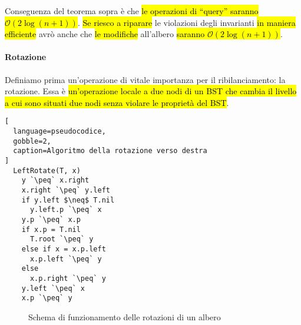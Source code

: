 \documentclass[a4paper,11pt,oneside]{article}
\theoremstyle{plain}
\theoremstyle{definition}
\theoremstyle{remark}
\newcommand{\peq}{$\gets$}
\begin{document}
Conseguenza del teorema sopra è che \hl{le operazioni di ``query'' saranno
$\mathcal{O}(2\log(n+1))$}. \hl{Se riesco a riparare} le violazioni degli
invarianti \hl{in maniera efficiente} avrò anche che \hl{le modifiche}
all'albero \hl{saranno $\mathcal{O}(2\log(n+1))$}.

\paragraph{Rotazione} Definiamo prima un'operazione di vitale importanza per il
ribilanciamento: la rotazione. Essa è \hl{un'operazione locale a due nodi di un BST
che cambia il livello a cui sono situati due nodi senza violare le proprietà del
BST}.

\begin{lstlisting}[
  language=pseudocodice,
  gobble=2,
  caption=Algoritmo della rotazione verso destra
]
  LeftRotate(T, x)
    y `\peq` x.right
    x.right `\peq` y.left
    if y.left $\neq$ T.nil
      y.left.p `\peq` x
    y.p `\peq` x.p
    if x.p = T.nil
      T.root `\peq` y
    else if x = x.p.left
      x.p.left `\peq` y
    else
      x.p.right `\peq` y
    y.left `\peq` x
    x.p `\peq` y
\end{lstlisting}

\begin{figure}[htb]
  \centering
  \caption{Schema di funzionamento delle rotazioni di un albero}%
  \label{fig:bst-rotate}
\end{figure}
\end{document}
